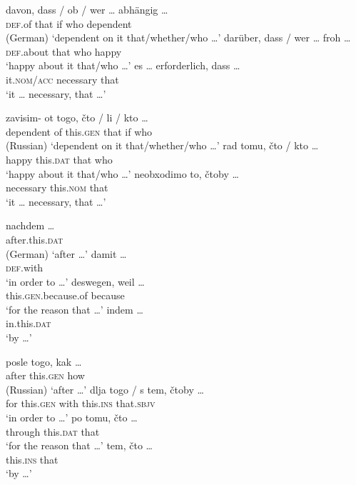 \documentclass[output=paper,
colorlinks,
citecolor=brown,
newtxmath
]{langscibook}
\begin{document}
\ea\label{ex:4.1}
    \ea \gll davon, dass / ob / wer {\dots} abhängig {\dots} \\
    \textsc{def}.of that {} if {} who {} dependent {} \\  \hfill (German)
    \glt `dependent on it that/whether/who {\dots}'
    \ex \gll darüber, dass / wer {\dots} froh {\dots} \\
    \textsc{def}.about that {} who {} happy {} \\
    \glt `happy about it that/who {\dots}'
    \ex \gll es {\dots} erforderlich, dass {\dots} \\
    it.\textsc{nom/acc} {} necessary that {} \\
    \glt `it {\dots} necessary, that {\dots}'
\z\z

\ea\label{ex:4.2}
    \ea \gll zavisim- ot togo, čto / li / kto {\dots} \\
    dependent of this.\textsc{gen} that {} if {} who {} \\ \hfill (Russian)
    \glt `dependent on it that/whether/who {\dots}'
    \ex \gll rad tomu, čto / kto {\dots} \\
    happy this.\textsc{dat} that {} who {} \\
    \glt `happy about it that/who {\dots}'
    \ex \gll neobxodimo to, čtoby {\dots} \\
    necessary this.\textsc{nom} that {} \\
    \glt `it {\dots} necessary, that {\dots}'
\z\z

\ea\label{ex:5.1}
    \ea \gll nachdem {\dots} \\
    after.this.\textsc{dat} {} \\ \hfill (German)
    \glt `after {\dots}'
    \ex \gll damit {\dots} \\
    \textsc{def}.with {} \\
    \glt `in order to {\dots}'
    \ex \gll deswegen, weil {\dots} \\
    this.\textsc{gen}.because.of because {} \\
    \glt `for the reason that {\dots}'
    \ex indem {\dots} \\
    in.this.\textsc{dat} {} \\
    \glt `by {\dots}'
\z\z

\ea\label{ex:5.2}
    \ea \gll posle togo, kak {\dots} \\
    after this.\textsc{gen} how {} \\ \hfill (Russian)
    \glt `after {\dots}'
    \ex \gll dlja togo / s tem, čtoby {\dots} \\
    for this.\textsc{gen} {} with this.\textsc{ins} that.\textsc{sbjv} \\
    \glt `in order to {\dots}'
    \ex \gll po tomu, čto {\dots} \\
    through this.\textsc{dat} that {} \\
    \glt `for the reason that {\dots}'
    \ex \gll tem, čto {\dots} \\
    this.\textsc{ins} that {} \\
    \glt `by {\dots}'
\z\z
\end{document}

